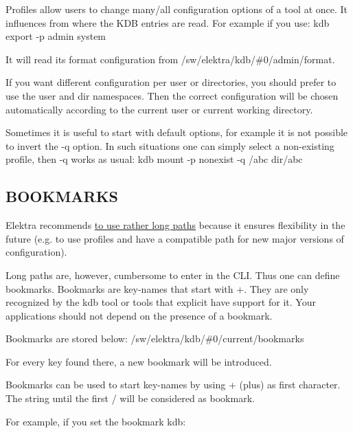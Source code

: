 Profiles allow users to change many/all configuration options of a tool at once. It influences from where the K\+D\+B entries are read. For example if you use\+: {\ttfamily kdb export -\/p admin system}

It will read its format configuration from {\ttfamily /sw/elektra/kdb/\#0/admin/format}.

If you want different configuration per user or directories, you should prefer to use the {\ttfamily user} and {\ttfamily dir} namespaces. Then the correct configuration will be chosen automatically according to the current user or current working directory.

Sometimes it is useful to start with default options, for example it is not possible to invert the {\ttfamily -\/q} option. In such situations one can simply select a non-\/existing profile, then {\ttfamily -\/q} works as usual\+: {\ttfamily kdb mount -\/p nonexist -\/q /abc dir/abc}

\subsection*{B\+O\+O\+K\+M\+A\+R\+K\+S}

Elektra recommends \hyperlink{doc_tutorials_application-integration_md}{to use rather long paths} because it ensures flexibility in the future (e.\+g. to use profiles and have a compatible path for new major versions of configuration).

Long paths are, however, cumbersome to enter in the C\+L\+I. Thus one can define bookmarks. Bookmarks are key-\/names that start with {\ttfamily +}. They are only recognized by the {\ttfamily kdb} tool or tools that explicit have support for it. Your applications should not depend on the presence of a bookmark.

Bookmarks are stored below\+: {\ttfamily /sw/elektra/kdb/\#0/current/bookmarks}

For every key found there, a new bookmark will be introduced.

Bookmarks can be used to start key-\/names by using {\ttfamily +} (plus) as first character. The string until the first {\ttfamily /} will be considered as bookmark.

For example, if you set the bookmark kdb\+: 


